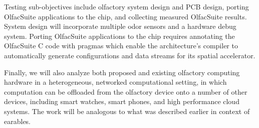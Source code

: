     Testing sub-objectives include olfactory system design
        and PCB design, porting OlfacSuite applications to the chip, and collecting
        measured OlfacSuite results.  System design will incorporate multiple
        odor sensors and a hardware debug system.
        Porting OlfacSuite applications to the chip requires annotating the OlfacSuite
        C code with pragmas which enable the architecture's compiler to automatically
        generate configurations and data streams for its spatial accelerator.
       
Finally, we will also analyze both proposed and existing olfactory computing hardware in a heterogeneous, networked
     computational setting, in which computation can be offloaded from the olfactory
     device onto a number of other devices, including smart watches, smart phones,
     and high performance cloud systems. The work will be analogous to what was described earlier in context of earables.


